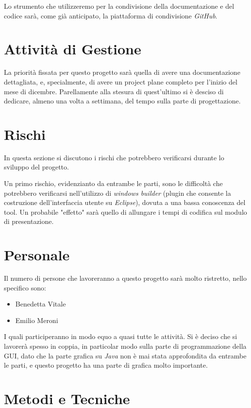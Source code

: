 \documentclass{book}
\begin{document}
Lo strumento che utilizzeremo per la condivisione della documentazione e del codice sarà, come già anticipato, la piattaforma di condivisione \textit{GitHub}.

\section{Attività di Gestione}

La priorità fissata per questo progetto sarà quella di avere una documentazione dettagliata, e, specialmente, di avere un project plane completo per l'inizio del mese di dicembre. Parellamente alla stesura di quest'ultimo si è desciso di dedicare, almeno una volta a settimana, del tempo sulla parte di progettazione. 


\section{Rischi}

In questa sezione si discutono i rischi che potrebbero verificarsi durante lo sviluppo del progetto. 

Un primo rischio, evidenzianto da entrambe le parti, sono le difficoltà che potrebbero verificarsi nell'utilizzo di \textit{windows builder} (plugin che consente la costruzione dell'interfaccia utente su \textit{Eclipse}), dovuta a una bassa conoscenza del tool. Un probabile "effetto" sarà quello di allungare i tempi di codifica sul modulo di presentazione.

\section{Personale}
Il numero di persone che lavoreranno a questo progetto sarà molto ristretto, nello specifico sono: 
\begin{itemize}
    \item Benedetta Vitale
    \item Emilio Meroni
\end{itemize}
I quali participeranno in modo equo a quasi tutte le attività. Si è deciso che si lavorerà spesso in coppia, in particolar modo sulla parte di programmazione della GUI, dato che la parte grafica su \textit{Java} non è mai stata approfondita da entrambe le parti, e questo progetto ha una parte di grafica molto importante.
     

\section{Metodi e Tecniche}
\end{document}
